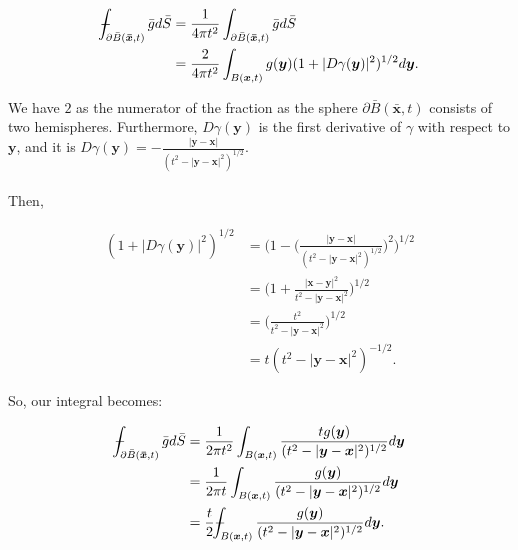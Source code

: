 \documentclass[a4paper, 12pt]{article}
\def\Xint#1{\mathchoice
{\XXint\displaystyle\textstyle{#1}}%
{\XXint\textstyle\scriptstyle{#1}}%
{\XXint\scriptstyle\scriptscriptstyle{#1}}%
{\XXint\scriptscriptstyle\scriptscriptstyle{#1}}%
\!\int}
\def\XXint#1#2#3{{\setbox0=\hbox{$#1{#2#3}{\int}$ }
\vcenter{\hbox{$#2#3$ }}\kern-.6\wd0}}
\def\dashint{\Xint-}
\numberwithin{equation}{section}
\begin{document}
\begin{equation*}
    \begin{aligned}
        \dashint_{\partial \bar{B}(\boldsymbol{\bar{x}}, t)} \bar{g} d\bar{S}&=\frac{1}{4\pi t^2}\int_{\partial \bar{B}(\boldsymbol{\bar{x}}, t)}\bar{g} d\bar{S}\\
        &=\frac{2}{4 \pi t^2} \int_{B(\boldsymbol{x}, t)} g(\boldsymbol{y})(1+|D\gamma (\boldsymbol{y})|^2)^{1/2}d\boldsymbol{y}.
    \end{aligned}
\end{equation*}

We have $2$ as the numerator of the fraction as the sphere $\partial\bar{B}(\boldsymbol{\bar{x}}, t)$ consists of two hemispheres. Furthermore, $D\gamma (\boldsymbol{y})$ is the first derivative of $\gamma$ with respect to $\boldsymbol{y}$, and it is
$D\gamma (\boldsymbol{y})=-\frac{|\boldsymbol{y}-\boldsymbol{x}|}{(t^2-|\boldsymbol{y}-\boldsymbol{x}|^2)^{1/2}}$. 
\\
\\

Then,

\begin{equation*}
    \begin{aligned}
        (1+|D\gamma (\boldsymbol{y})|^2)^{1/2}&=\Big(1-\Big(\frac{|\boldsymbol{y}-\boldsymbol{x}|}{(t^2-|\boldsymbol{y}-\boldsymbol{x}|^2)^{1/2}}\Big)^2\Big)^{1/2}\\
        &=\Big(1+\frac{|\boldsymbol{x}-\boldsymbol{y}|^2}{t^2-|\boldsymbol{y}-\boldsymbol{x}|^2}\Big)^{1/2}\\
        &=\Big(\frac{t^2}{t^2-|\boldsymbol{y}-\boldsymbol{x}|^2}\Big)^{1/2}\\
        &=t(t^2-|\boldsymbol{y}-\boldsymbol{x}|^2)^{-1/2}.
    \end{aligned}
\end{equation*}

So, our integral becomes:

\begin{equation*}
    \begin{aligned}
        \dashint_{\partial \bar{B}(\boldsymbol{\bar{x}}, t)} \bar{g} d\bar{S}&=\frac{1}{2 \pi t^2}\int_{B(\boldsymbol{x},t)}\frac{tg(\boldsymbol{y})}{(t^2-|\boldsymbol{y}-\boldsymbol{x}|^2)^{1/2}}d\boldsymbol{y}\\
        &=\frac{1}{2 \pi t}\int_{B(\boldsymbol{x},t)}\frac{g(\boldsymbol{y})}{(t^2-|\boldsymbol{y}-\boldsymbol{x}|^2)^{1/2}}d\boldsymbol{y}\\
        &=\frac{t}{2}\dashint_{B(\boldsymbol{x},t)}\frac{g(\boldsymbol{y})}{(t^2-|\boldsymbol{y}-\boldsymbol{x}|^2)^{1/2}}d\boldsymbol{y}.
    \end{aligned}
\end{equation*}
\end{document}

